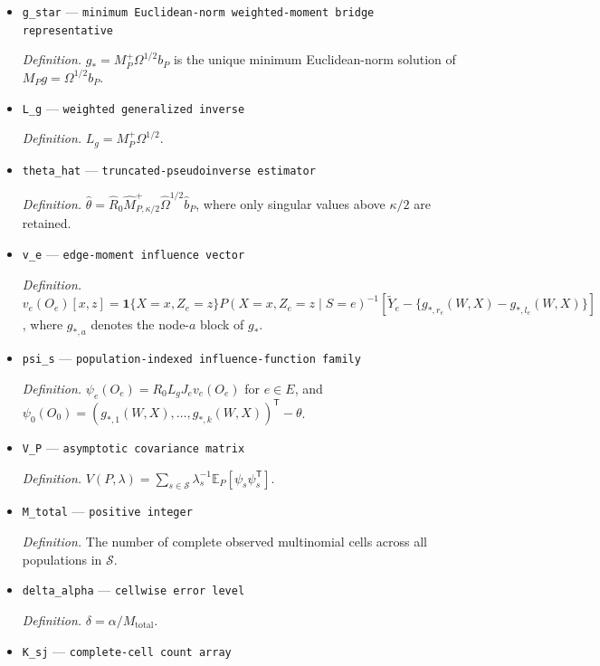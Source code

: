\documentclass{article}
\begin{document}
\begin{itemize}
  \item \texttt{g\_\allowbreak{}star} --- \texttt{minimum Euclidean-\allowbreak{}norm weighted-\allowbreak{}moment bridge representative}
  \par\smallskip\noindent\emph{Definition.} \(g_*=M_P^+\Omega^{1/2}b_P\) is the unique minimum Euclidean-norm solution of \(M_Pg=\Omega^{1/2}b_P\).
  \item \texttt{L\_\allowbreak{}g} --- \texttt{weighted generalized inverse}
  \par\smallskip\noindent\emph{Definition.} \(L_g=M_P^+\Omega^{1/2}\).
  \item \texttt{theta\_\allowbreak{}hat} --- \texttt{truncated-\allowbreak{}pseudoinverse estimator}
  \par\smallskip\noindent\emph{Definition.} \(\widehat\theta=\widehat R_0\widehat M_{P,\kappa/2}^{+}\widehat\Omega^{1/2}\widehat b_P\), where only singular values above \(\kappa/2\) are retained.
  \item \texttt{v\_\allowbreak{}e} --- \texttt{edge-\allowbreak{}moment influence vector}
  \par\smallskip\noindent\emph{Definition.} \(v_e(O_e)[x,z]=\mathbf 1\{X=x,Z_e=z\}P(X=x,Z_e=z\mid S=e)^{-1}[\widetilde Y_e-\{g_{*,r_e}(W,X)-g_{*,l_e}(W,X)\}]\), where \(g_{*,a}\) denotes the node-\(a\) block of \(g_*\).
  \item \texttt{psi\_\allowbreak{}s} --- \texttt{population-\allowbreak{}indexed influence-\allowbreak{}function family}
  \par\smallskip\noindent\emph{Definition.} \(\psi_e(O_e)=R_0L_gJ_ev_e(O_e)\) for \(e\in E\), and \(\psi_0(O_0)=(g_{*,1}(W,X),\ldots,g_{*,k}(W,X))^{\mathsf T}-\theta\).
  \item \texttt{V\_\allowbreak{}P} --- \texttt{asymptotic covariance matrix}
  \par\smallskip\noindent\emph{Definition.} \(V(P,\lambda)=\sum_{s\in\mathcal S}\lambda_s^{-1}\mathbb E_P[\psi_s\psi_s^{\mathsf T}]\).
  \item \texttt{M\_\allowbreak{}total} --- \texttt{positive integer}
  \par\smallskip\noindent\emph{Definition.} The number of complete observed multinomial cells across all populations in \(\mathcal S\).
  \item \texttt{delta\_\allowbreak{}alpha} --- \texttt{cellwise error level}
  \par\smallskip\noindent\emph{Definition.} \(\delta=\alpha/M_{\mathrm{total}}\).
  \item \texttt{K\_\allowbreak{}sj} --- \texttt{complete-\allowbreak{}cell count array}

\end{itemize}
\end{document}
